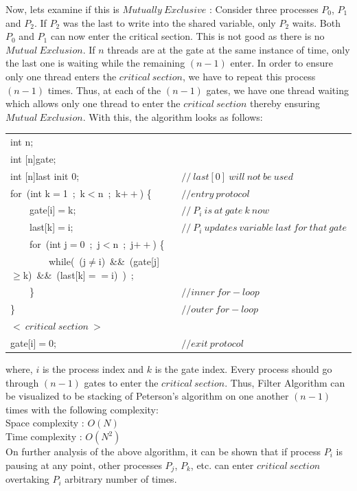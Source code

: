 \documentclass[twoside]{article}
\begin{document}
Now, lets examine if this is $Mutually\ Exclusive$ : Consider three processes $P_0$, $P_1$ and $P_2$. If $P_2$ was the last to write into the shared variable, only $P_2$ waits. Both $P_0$ and $P_1$ can now enter the critical section. This is not good as there is no $Mutual\ Exclusion$. If $n$ threads are at the gate at the same instance of time, only the last one is waiting while the remaining $(n-1)$ enter. In order to ensure only one thread enters the $critical\ section$, we have to repeat this process $(n-1)$ times. Thus, at each of the $(n-1)$ gates, we have one thread waiting which allows only one thread to enter the $critical\ section$ thereby ensuring $Mutual\ Exclusion$. With this, the algorithm looks as follows:

\begin{table}[ht]
    \centering
    \begin{tabular}{ l  l }
         int n;  \\
         int [n]gate; \\
         int [n]last init 0; &  $//\ last[0]\ will\ not\ be\ used$ \\
         for\ (int k$=$1\ ;\ k$<$n\ ;\ k$++$) \{\ & $//entry\ protocol$ \\
         \ \ \ \ gate[i]$=$k; & $//\ P_i\ is\ at\ gate\ k\ now$ \\
         \ \ \ \ last[k]$=$i; & $//\ P_i\ updates\ variable\ last\ for\ that\ gate$\\
         \ \ \ \ for\ (int j$=$0\ ;\ j$<$n\ ;\ j$++$) \{ & \\
         \ \ \ \ \ \ \ \ while(\ (j$\neq$i)\ \&\&\ (gate[j]$\geq$k)\ \&\&\ (last[k]$==$i)\ )\ ;&\\
         \ \ \ \ \} & $//inner\ for-loop$\\
         \} & $//outer\ for-loop$\\
         $<\ critical\ section\ >$ & \\
         gate[i]$=$0; & $//exit\ protocol$ \\
    \end{tabular}
\end{table} 

where, $i$ is the process index and $k$ is the gate index. Every process should go through $(n-1)$ gates to enter the $critical\ section$. Thus, Filter Algorithm can be visualized to be stacking of Peterson's algorithm on one another $(n-1)$ times with the following complexity:\\
Space complexity : $O(N)$ \\
Time complexity : $O(N^2)$ \\
On further analysis of the above algorithm, it can be shown that if process $P_i$ is pausing at any point, other processes $P_j$, $P_k$, etc. can enter $critical\ section$ overtaking $P_i$ arbitrary number of times.
\end{document}

